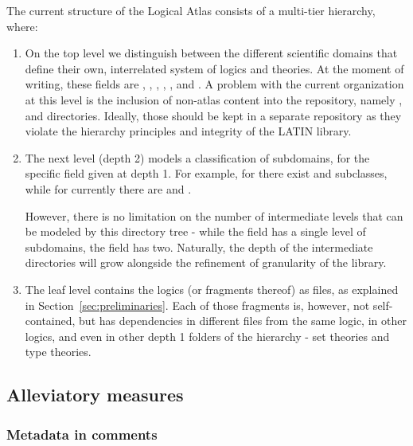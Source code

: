 The current structure of the Logical Atlas consists of a multi-tier
hierarchy, where:
\begin{enumerate}
\item On the top level we distinguish between the different scientific
  domains that define their own, interrelated system of logics and
  theories. At the moment of writing, these fields are
  , , ,
  , , and . A problem with the current organization at this level is
  the inclusion of non-atlas content into the repository,
  namely ,  and 
  directories. Ideally, those should be kept in a separate
  repository as they violate the hierarchy principles and integrity of the LATIN library.
\item The next level (depth 2) models a classification of
  subdomains, for the specific field given at depth 1. For example,
  for  there exist  and 
  subclasses, while for  currently there are  and
  . 

  However, there is no limitation on the number of intermediate levels
  that can be modeled by this directory tree - while the 
   field has a single level of subdomains, the
   field has two. Naturally,
  the depth of the intermediate directories will grow alongside the
  refinement of granularity of the library.
\item The leaf level contains the logics (or fragments thereof)
  as  files, as explained in Section~\ref{sec:preliminaries}. Each of those fragments is, however,
  not self-contained, but has dependencies in different files from the same logic, in other logics, and even in other depth 1 folders of the hierarchy - set theories and type theories.
\end{enumerate}


\subsection{Alleviatory measures}

\subsubsection{Metadata in comments}

